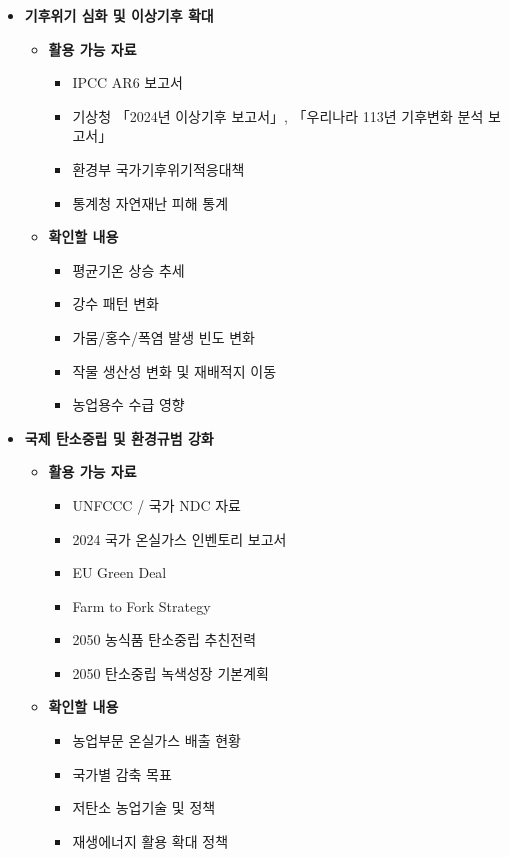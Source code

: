 \begin{itemize}

    \item \textbf{기후위기 심화 및 이상기후 확대}

    \begin{itemize}
        \item \textbf{활용 가능 자료}
        \begin{itemize}
            \item IPCC AR6 보고서
            \item 기상청 「2024년 이상기후 보고서」, 「우리나라 113년 기후변화 분석 보고서」
            \item 환경부 국가기후위기적응대책
            \item 통계청 자연재난 피해 통계
        \end{itemize}

        \item \textbf{확인할 내용}
        \begin{itemize}
            \item 평균기온 상승 추세
            \item 강수 패턴 변화
            \item 가뭄/홍수/폭염 발생 빈도 변화
            \item 작물 생산성 변화 및 재배적지 이동
            \item 농업용수 수급 영향
        \end{itemize}
    \end{itemize}

    \item \textbf{국제 탄소중립 및 환경규범 강화}

    \begin{itemize}
        \item \textbf{활용 가능 자료}
        \begin{itemize}
            \item UNFCCC / 국가 NDC 자료
            \item 2024 국가 온실가스 인벤토리 보고서
            \item EU Green Deal
            \item Farm to Fork Strategy
            \item 2050 농식품 탄소중립 추친전력
            \item 2050 탄소중립 녹색성장 기본계획
        \end{itemize}

        \item \textbf{확인할 내용}
        \begin{itemize}
            \item 농업부문 온실가스 배출 현황
            \item 국가별 감축 목표
            \item 저탄소 농업기술 및 정책
            \item 재생에너지 활용 확대 정책
        \end{itemize}
    \end{itemize}


\end{itemize}
